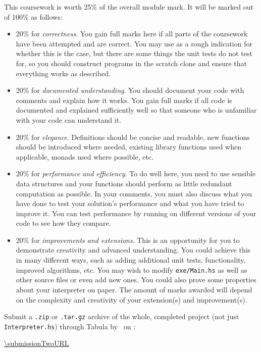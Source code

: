 This coursework is worth 25\% of the overall module mark. It will be marked out of 100\% as follows:
\begin{itemize}
	\item 20\% for \emph{correctness}. You gain full marks here if all parts of the coursework have been attempted and are correct. You may use  as a rough indication for whether this is the case, but there are some things the unit tests do not test for, so you should construct programs in the scratch clone and ensure that everything works as described.
	
	\item 20\% for \emph{documented understanding}. You should document your code with comments and explain how it works. You gain full marks if all code is documented and explained sufficiently well so that someone who is unfamiliar with your code can understand it.
	
	\item 20\% for \emph{elegance}. Definitions should be concise and readable, new functions should be introduced where needed, existing library functions used when applicable, monads used where possible, etc. 
	
	\item 20\% for \emph{performance and efficiency}. To do well here, you need to use sensible data structures and your functions should perform as little redundant computation as possible. In your comments, you must also discuss what you have done to test your solution's performance and what you have tried to improve it. You can test performance by running  on different versions of your code to see how they compare. 
	
	\item 20\% for \emph{improvements and extensions}. This is an opportunity for you to demonstrate creativity and advanced understanding. You could achieve this in many different ways, such as adding additional unit tests, functionality, improved algorithms, etc. You may wish to modify \texttt{\small exe/Main.hs} as well as other source files or even add new ones. You could also prove some properties about your interpreter on paper. The amount of marks awarded will depend on the complexity and creativity of your extension(s) and improvement(s).
\end{itemize}
Submit a \texttt{\small .zip} or \texttt{\small .tar.gz} archive of the whole, completed project (not just \texttt{\small Interpreter.hs}) through Tabula by \deadlineTwoTime\ on \deadlineTwoDate:

\begin{center} 
\url{\submissionTwoURL}
\end{center}
